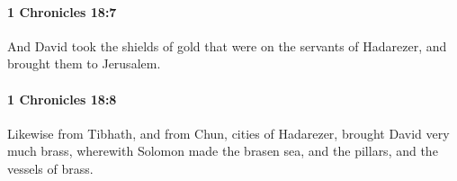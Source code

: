 		\paragraph{1 Chronicles 18:7} %
			\label{1CHRONICLES-18-7}

			And David took the shields of gold that were on the servants of Hadarezer, and brought them to Jerusalem.


		\paragraph{1 Chronicles 18:8} %
			\label{1CHRONICLES-18-8}

			Likewise from Tibhath, and from Chun, cities of Hadarezer, brought David very much brass, wherewith Solomon made the brasen sea, and the pillars, and the vessels of brass.


